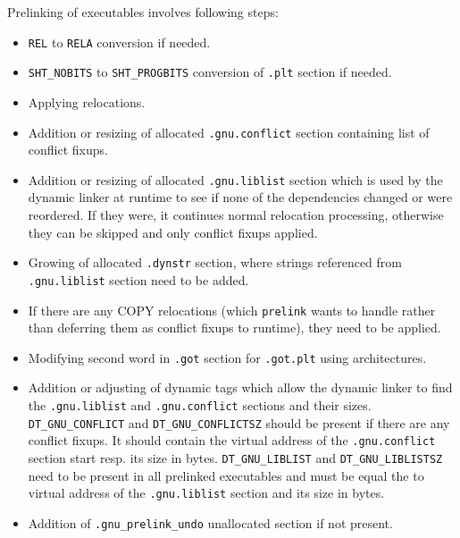 \documentclass[twoside]{article}
\def\tts#1{\texttt{\small #1}}
\begin{document}
Prelinking of executables involves following steps:
\begin{itemize}
\item \tts{REL} to \tts{RELA} conversion if needed.
\item \tts{SHT\_NOBITS} to \tts{SHT\_PROGBITS} conversion of \tts{.plt} section
if needed.
\item Applying relocations.
\item Addition or resizing of allocated \tts{.gnu.conflict} section containing
list of conflict fixups.
\item Addition or resizing of allocated \tts{.gnu.liblist} section which is used
by the dynamic linker at runtime to see if none of the dependencies changed
or were reordered.  If they were, it continues normal relocation processing,
otherwise they can be skipped and only conflict fixups applied.
\item Growing of allocated \tts{.dynstr} section, where strings referenced from
\tts{.gnu.liblist} section need to be added.
\item If there are any COPY relocations (which \tts{prelink} wants to handle
rather than deferring them as conflict fixups to runtime), they need to be applied.
\item Modifying second word in \tts{.got} section for \tts{.got.plt} using
architectures.
\item Addition or adjusting of dynamic tags which allow the dynamic linker
to find the \tts{.gnu.liblist} and \tts{.gnu.conflict} sections and their
sizes.  \tts{DT\_GNU\_CONFLICT} and \tts{DT\_GNU\_CONFLICTSZ} should be present
if there are any conflict fixups.  It should contain the virtual address of
the \tts{.gnu.conflict} section start resp. its size in bytes. 
\tts{DT\_GNU\_LIBLIST} and \tts{DT\_GNU\_LIBLISTSZ} need to be present in
all prelinked executables and must be equal the to virtual address of
the \tts{.gnu.liblist} section and its size in bytes.
\item Addition of \tts{.gnu\_prelink\_undo} unallocated section if not present.
\end{itemize}
\end{document}
